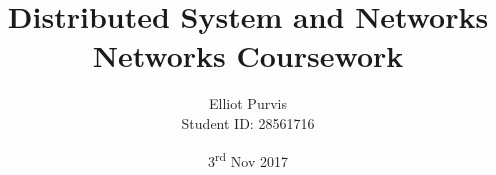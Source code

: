\begin{titlepage}
\title{Distributed System and Networks \\ Networks Coursework}
\author{Elliot Purvis \\ Student ID: 28561716}
\date{3\textsuperscript{rd} Nov 2017}
\maketitle
\end{titlepage}